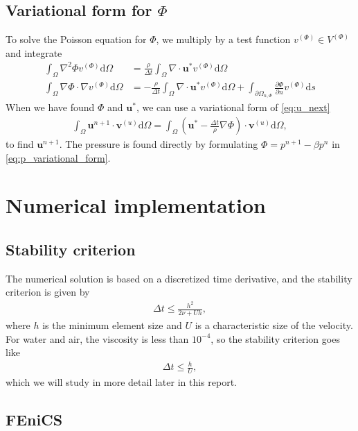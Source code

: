 \documentclass[a4paper,10pt]{article}
\renewcommand{\vec}[1]{\mathbf{#1}}
\renewcommand{\(}{\left(}
\renewcommand{\)}{\right)}
\newcommand{\dm}[1]{\text{d}#1}
\newcommand{\dpart}[2]{\frac{\partial#1}{\partial#2}}
\begin{document}
\subsection{Variational form for $\Phi$}
To solve the Poisson equation for $\Phi$, we multiply by a test function $v^{(\Phi)} \in V^{(\Phi)}$ and integrate
\begin{align}
  \int_\Omega \nabla^2\Phi v^{(\Phi)} \dm \Omega &= \frac{\rho}{\Delta t} \int_\Omega \nabla \cdot \vec u^* v^{(\Phi)} \dm \Omega \\
  \int_\Omega \nabla\Phi \cdot \nabla v^{(\Phi)} \dm \Omega &= -\frac{\rho}{\Delta t} \int_\Omega \nabla \cdot \vec u^* v^{(\Phi)} \dm \Omega + \int_{\partial \Omega_{n,\Phi}} \dpart{\Phi}{n}v^{(\Phi)} \dm s \label{eq:p_variational_form}
\end{align}
When we have found $\Phi$ and $\vec u^*$, we can use a variational form of \eqref{eq:u_next}
\begin{align}
  \label{eq:u_variational_form}
  \int_\Omega \vec u^{n+1}\cdot \vec v^{(u)} \dm \Omega = \int_\Omega (\vec u^* - \frac{\Delta t}{\rho}\nabla \Phi)\cdot \vec v^{(u)} \dm \Omega,
\end{align}
to find $\vec u^{n+1}$. The pressure is found directly by formulating $\Phi = p^{n+1} - \beta p^n$ in \eqref{eq:p_variational_form}.


\section{Numerical implementation}

\subsection{Stability criterion}
The numerical solution is based on a discretized time derivative, and the stability criterion is given by \cite{ns_numerical_solutions}
\begin{align*}
  \Delta t \leq \frac{h^2}{2\nu + Uh},
\end{align*}
where $h$ is the minimum element size and $U$ is a characteristic size of the velocity. For water and air, the viscosity is less than $10^{-4}$, so the stability criterion goes like
\begin{align*}
  \Delta t \leq \frac{h}{U},
\end{align*}
which we will study in more detail later in this report.

\subsection{FEniCS}
\end{document}
